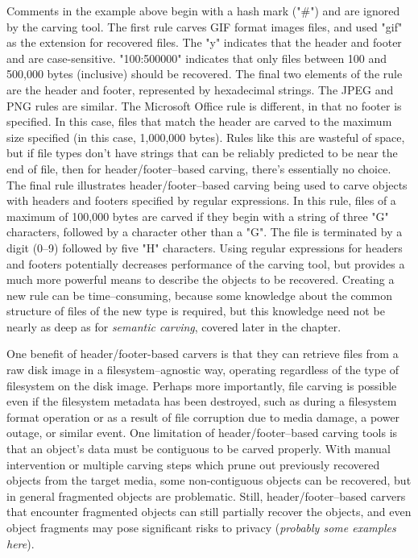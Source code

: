 Comments in the example above begin with a hash mark ("\#") and are ignored by the carving tool.  The first rule carves GIF format images files, and used "gif" as the extension for recovered files.  The "y" indicates that the header and footer and are case-sensitive.  "100:500000" indicates that only files between 100 and 500,000 bytes (inclusive) should be recovered.  The final two elements of the rule are the header and footer, represented by hexadecimal strings.  The JPEG and PNG rules are similar.  The Microsoft Office rule is different, in that no footer is specified.  In this case, files that match the header are carved to the maximum size specified (in this case, 1,000,000 bytes).  Rules like this are wasteful of space, but if file types don't have strings that can be reliably predicted to be near the end of file, then for header/footer--based carving, there's essentially no choice.  The final rule illustrates header/footer--based carving being used to carve objects with headers and footers specified by regular expressions.  In this rule, files of a maximum of 100,000 bytes are carved if they begin with a string of three "G" characters, followed by a character other than a "G".   The file is terminated by a digit (0--9) followed by five "H" characters.  Using regular expressions for headers and footers potentially decreases performance of the carving tool, but provides a much more powerful means to describe the objects to be recovered.  Creating a new rule can be time--consuming, because some knowledge about the common structure of files of the new type is required, but this knowledge need not be nearly as deep as for \emph{semantic carving}, covered later in the chapter.

One benefit of header/footer-based carvers is that they can retrieve files from a raw disk image in a filesystem--agnostic way, operating regardless of the type of filesystem on the disk image.  Perhaps more importantly, file carving is possible even if the filesystem metadata has been destroyed, such as during a filesystem format operation or as a result of file corruption due to media damage, a power outage, or similar event.    One limitation of header/footer--based carving tools is that an object's data must be contiguous to be carved properly.  With manual intervention or multiple carving steps which prune out previously recovered objects from the target media, some non-contiguous objects can be recovered, but in general fragmented objects are problematic.  Still, header/footer--based carvers that encounter fragmented objects can still partially recover the objects, and even object fragments may pose significant risks to privacy (\emph{probably some examples here}). 

